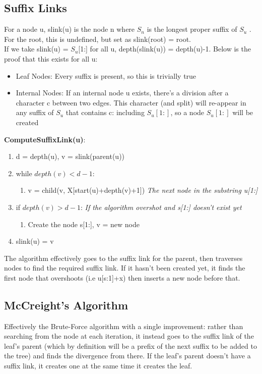\subsection{Suffix Links}
For a node u, slink(u) is the node n where $S_n$ is the longest proper suffix of $S_u$ . For the root, this is undefined, but set as slink(root) = root. \\
If we take slink(u) = $S_u$[1:] for all u, depth(slink(u)) = depth(u)-1. Below is the proof that this exists for all u:

\begin{itemize}
    \item Leaf Nodes: Every suffix is present, so this is trivially true
    \item Internal Nodes: If an internal node u exists, there's a division after a character c between two edges. This character (and split) will re-appear in any suffix of $S_u$ that contains c: including $S_u[1:]$, so a node $S_u[1:]$ will be created
\end{itemize}
\newpage
\textbf{ComputeSuffixLink(u)}:
\begin{enumerate}[label=\Alph*]
    \item d = depth(u), v = slink(parent(u))
    \item while $depth(v) < d-1$:
        \begin{enumerate}
            \item [] v = child(v, X[start(u)+depth(v)+1]) \emph{The next node in the substring u[1:]}
        \end{enumerate}     
    \item if $depth(v) > d-1$: \emph{If the algorithm overshot and s[1:] doesn't exist yet}
        \begin{enumerate}
            \item [] Create the node s[1:], v = new node
        \end{enumerate}     
    \item slink(u) = v    
\end{enumerate}        
The algorithm effectively goes to the suffix link for the parent, then traverses nodes to find the required suffix link. If it hasn't been created yet, it finds the first node that overshoots (i.e u[s:1]+x) then inserts a new node before that.

\subsection{McCreight's Algorithm}
Effectively the Brute-Force algorithm with a single improvement: rather than searching from the node at each iteration, it instead goes to the suffix link of the leaf's parent (which by definition will be a prefix of the next suffix to be added to the tree) and finds the divergence from there. If the leaf's parent doesn't have a suffix link, it creates one at the same time it creates the leaf.

